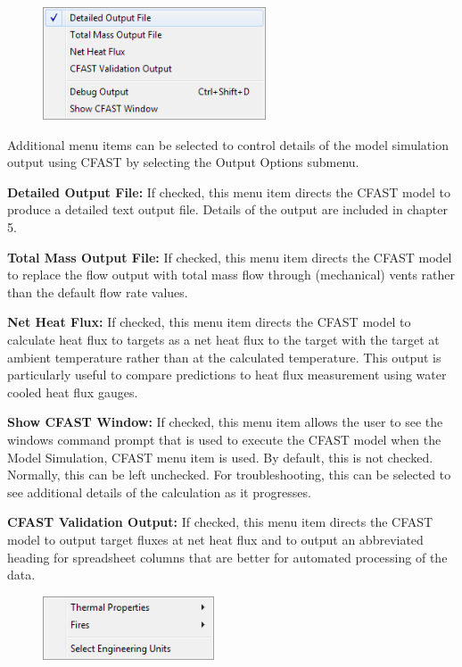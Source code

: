 \newpage

\begin{figure}
  \includegraphics[width=2.6in]{FIGURES/Running_CFAST/Output_Options_Menu}
\end{figure}

Additional menu items can be selected to control details of the model simulation output using CFAST by selecting the Output Options submenu.

\textbf{Detailed Output File:} If checked, this menu item directs the CFAST model to produce a detailed text output file.  Details of the output are included in chapter 5.

\textbf{Total Mass Output File:} If checked, this menu item directs the CFAST model to replace the flow output with total mass flow through (mechanical) vents rather than the default flow rate values.

\textbf{Net Heat Flux:}  If checked, this menu item directs the CFAST model to calculate heat flux to targets as a net heat flux to the target with the target at ambient temperature rather than at the calculated temperature.  This output is particularly useful to compare predictions to heat flux measurement using water cooled heat flux gauges.

\textbf{Show CFAST Window:} If checked, this menu item allows the user to see the windows command prompt that is used to execute the CFAST model when the Model Simulation, CFAST menu item is used.  By default, this is not checked.  Normally, this can be left unchecked.  For troubleshooting, this can be selected to see additional details of the calculation as it progresses.

\textbf{CFAST Validation Output:} If checked, this menu item directs the CFAST model to output target fluxes at net heat flux and to output an abbreviated heading for spreadsheet columns that are better for automated processing of the data.


\begin{figure}
  \includegraphics[width=2in]{FIGURES/Running_CFAST/Tools_Menu}
\end{figure}

